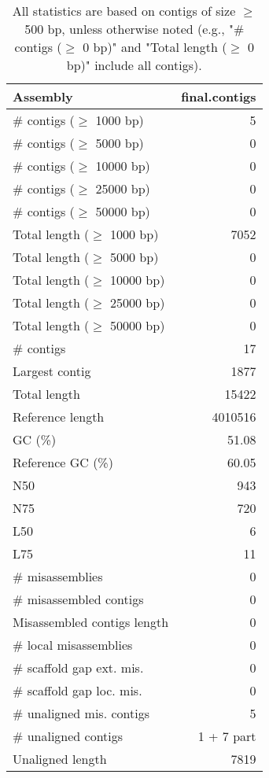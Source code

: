 \documentclass[12pt,a4paper]{article}
\begin{document}
\begin{table}[ht]
\begin{center}
\caption{All statistics are based on contigs of size $\geq$ 500 bp, unless otherwise noted (e.g., "\# contigs ($\geq$ 0 bp)" and "Total length ($\geq$ 0 bp)" include all contigs).}
\begin{tabular}{|l*{1}{|r}|}
\hline
Assembly & final.contigs \\ \hline
\# contigs ($\geq$ 1000 bp) & 5 \\ \hline
\# contigs ($\geq$ 5000 bp) & 0 \\ \hline
\# contigs ($\geq$ 10000 bp) & 0 \\ \hline
\# contigs ($\geq$ 25000 bp) & 0 \\ \hline
\# contigs ($\geq$ 50000 bp) & 0 \\ \hline
Total length ($\geq$ 1000 bp) & 7052 \\ \hline
Total length ($\geq$ 5000 bp) & 0 \\ \hline
Total length ($\geq$ 10000 bp) & 0 \\ \hline
Total length ($\geq$ 25000 bp) & 0 \\ \hline
Total length ($\geq$ 50000 bp) & 0 \\ \hline
\# contigs & 17 \\ \hline
Largest contig & 1877 \\ \hline
Total length & 15422 \\ \hline
Reference length & 4010516 \\ \hline
GC (\%) & 51.08 \\ \hline
Reference GC (\%) & 60.05 \\ \hline
N50 & 943 \\ \hline
N75 & 720 \\ \hline
L50 & 6 \\ \hline
L75 & 11 \\ \hline
\# misassemblies & 0 \\ \hline
\# misassembled contigs & 0 \\ \hline
Misassembled contigs length & 0 \\ \hline
\# local misassemblies & 0 \\ \hline
\# scaffold gap ext. mis. & 0 \\ \hline
\# scaffold gap loc. mis. & 0 \\ \hline
\# unaligned mis. contigs & 5 \\ \hline
\# unaligned contigs & 1 + 7 part \\ \hline
Unaligned length & 7819 \\ \hline

\end{tabular}
\end{center}
\end{table}
\end{document}
